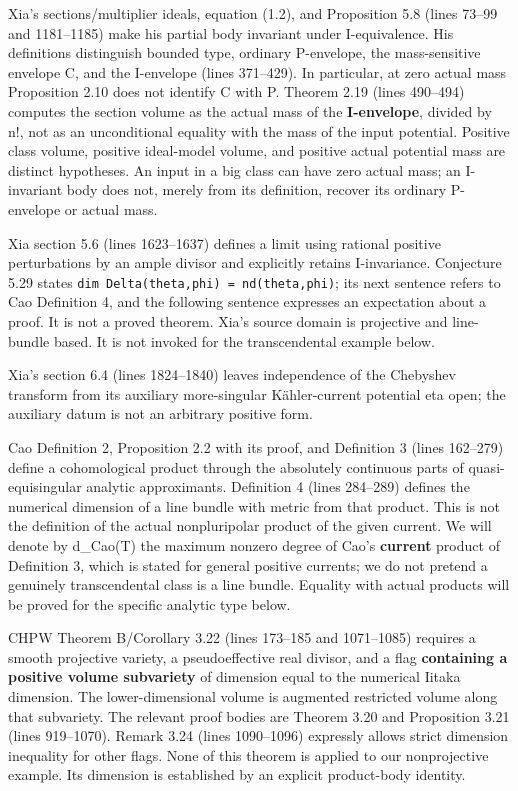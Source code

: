 \documentclass[11pt]{article}
\begin{document}
Xia's sections/\allowbreak{}multiplier ideals, equation (1.2), and Proposition 5.8 (lines 73–99 and 1181–1185) make his partial body invariant under I-\allowbreak{}equivalence. His definitions distinguish bounded type, ordinary P-\allowbreak{}envelope, the mass-\allowbreak{}sensitive envelope C, and the I-\allowbreak{}envelope (lines 371–429). In particular, at zero actual mass Proposition 2.10 does not identify C with P. Theorem 2.19 (lines 490–494) computes the section volume as the actual mass of the \textbf{I-\allowbreak{}envelope}, divided by n!, not as an unconditional equality with the mass of the input potential. Positive class volume, positive ideal-\allowbreak{}model volume, and positive actual potential mass are distinct hypotheses. An input in a big class can have zero actual mass; an I-\allowbreak{}invariant body does not, merely from its definition, recover its ordinary P-\allowbreak{}envelope or actual mass.

Xia section 5.6 (lines 1623–1637) defines a limit using rational positive perturbations by an ample divisor and explicitly retains I-\allowbreak{}invariance. Conjecture 5.29 states \texttt{dim Delta(theta,phi) =\allowbreak{} nd(theta,phi)}; its next sentence refers to Cao Definition 4, and the following sentence expresses an expectation about a proof. It is not a proved theorem. Xia's source domain is projective and line-\allowbreak{}bundle based. It is not invoked for the transcendental example below.

Xia's section 6.4 (lines 1824–1840) leaves independence of the Chebyshev transform from its auxiliary more-\allowbreak{}singular Kähler-\allowbreak{}current potential eta open; the auxiliary datum is not an arbitrary positive form.

Cao Definition 2, Proposition 2.2 with its proof, and Definition 3 (lines 162–279) define a cohomological product through the absolutely continuous parts of quasi-\allowbreak{}equisingular analytic approximants. Definition 4 (lines 284–289) defines the numerical dimension of a line bundle with metric from that product. This is not the definition of the actual nonpluripolar product of the given current. We will denote by d\_\allowbreak{}Cao(T) the maximum nonzero degree of Cao's \textbf{current} product of Definition 3, which is stated for general positive currents; we do not pretend a genuinely transcendental class is a line bundle. Equality with actual products will be proved for the specific analytic type below.

CHPW Theorem B/\allowbreak{}Corollary 3.22 (lines 173–185 and 1071–1085) requires a smooth projective variety, a pseudoeffective real divisor, and a flag \textbf{containing a positive volume subvariety} of dimension equal to the numerical Iitaka dimension. The lower-\allowbreak{}dimensional volume is augmented restricted volume along that subvariety. The relevant proof bodies are Theorem 3.20 and Proposition 3.21 (lines 919–1070). Remark 3.24 (lines 1090–1096) expressly allows strict dimension inequality for other flags. None of this theorem is applied to our nonprojective example. Its dimension is established by an explicit product-\allowbreak{}body identity.
\end{document}
